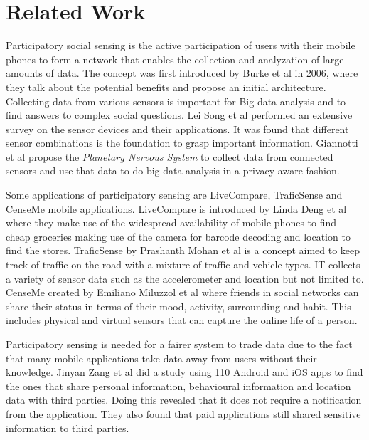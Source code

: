 \chapter{Related Work}


Participatory social sensing is the active participation of users with their mobile phones to form a network that enables the collection and analyzation of large amounts of data.
The concept was first introduced by Burke et al in 2006, where they talk about the potential benefits and propose an initial architecture. Collecting data from various sensors is important for Big data analysis and to find answers to complex social questions. Lei Song et al \cite{song2014health} performed an extensive survey on the sensor devices and their applications. It was found that different sensor combinations is the foundation to grasp important information. Giannotti et al \cite{giannotti2012planetary} propose the \textit{Planetary Nervous System} to collect data from connected sensors and use that data to do big data analysis in a privacy aware fashion.

Some applications of participatory sensing are LiveCompare, TraficSense and CenseMe mobile applications. LiveCompare is introduced by Linda Deng et al
\cite{deng2009livecompare} where they make use of the widespread availability of mobile phones to find cheap groceries making use of the camera for barcode decoding and location to find the stores. TraficSense by Prashanth Mohan et al \cite{mohan2008nericell} is a concept aimed to keep track of traffic on the road with a mixture of traffic and vehicle types. IT collects a variety of sensor data such as the accelerometer and location but not limited to. CenseMe created by Emiliano Miluzzol et al \cite{miluzzo2007cenceme} where friends in social networks can share their status in terms of their mood, activity, surrounding and habit. This includes physical and virtual sensors that can capture the online life of a person. 

Participatory sensing is needed for a fairer system to trade data due to the fact that many mobile applications take data away from users without their knowledge. Jinyan Zang et al
\cite{zang2015knows} did a study using 110 Android and iOS apps to find the ones that share personal information, behavioural information and location data with third parties. Doing this revealed that it does not require a notification from the application. They also found that paid applications still shared sensitive information to third parties. 

